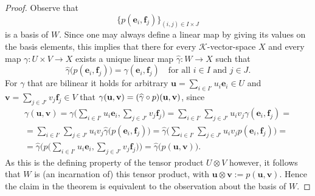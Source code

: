 \documentclass[12pt]{article}
\newcommand{\Fpil}{\longrightarrow}
\newcommand{\vek}[1]{\mathbf{#1}}
\newcommand{\K}{\mathcal{K}}
\begin{document}
\begin{proof}
  Observe that
  $$
    \bigl\{ p(\vek{e}_i,\vek{f}_j) \bigr\}_{(i,j) \in I \times J}
  $$
  is a basis of $W$. Since one may always define a linear map 
  by giving its values on the basis elements, this implies that there for every 
  $\K$-vector-space $X$ and every map \(\gamma\colon U \times V \Fpil 
  X\) exists a unique linear map \(\widehat{\gamma}\colon W \Fpil X\) 
  such that
  $$
    \widehat{\gamma}\bigl( p(\vek{e}_i,\vek{f}_j) \bigr) =
    \gamma(\vek{e}_i,\vek{f}_j)
    \quad\text{for all \(i \in I\) and \(j \in J\).}
  $$
  For $\gamma$ that are bilinear it holds for arbitrary \(\vek{u} = 
  \sum_{i \in I'} u_i\vek{e}_i \in U\) and \(\vek{v} = 
  \sum_{j \in J'} v_j\vek{f}_j \in V\) that \(\gamma(\vek{u},\vek{v}) 
  = (\widehat{\gamma} \circ\nobreak p)(\vek{u},\vek{v})\), since
  \begin{multline*}
    \gamma(\vek{u},\vek{v}) =
    \gamma\biggl( \sum_{i \in I'} u_i\vek{e}_i, 
      \sum_{j \in J'} v_j\vek{f}_j \biggr) =
    \sum_{i \in I'} \sum_{j \in J'} u_i v_j 
      \gamma(\vek{e}_i,\vek{f}_j) = \\ =
    \sum_{i \in I'} \sum_{j \in J'} u_i v_j 
      \widehat{\gamma}\bigl( p(\vek{e}_i,\vek{f}_j) \bigr) =
    \widehat{\gamma} \biggl(
      \sum_{i \in I'} \sum_{j \in J'} u_i v_j p(\vek{e}_i,\vek{f}_j)
      \biggr) = \\ =
    \widehat{\gamma} \Biggl(
      p\biggl( \sum_{i \in I'} u_i \vek{e}_i,
      \sum_{j \in J'} v_j \vek{f}_j \biggr)
      \Biggr) =
    \widehat{\gamma}\bigl( p(\vek{u},\vek{v}) \bigr)
    \text{.}
  \end{multline*}
  As this is the defining property of the tensor product $U \otimes 
  V$ however, it follows that $W$ is (an incarnation of) this tensor 
  product, with \(\vek{u} \otimes \vek{v} := p(\vek{u},\vek{v})\). 
  Hence the claim in the theorem is equivalent to the observation 
  about the basis of $W$.
\end{proof}
\end{document}
